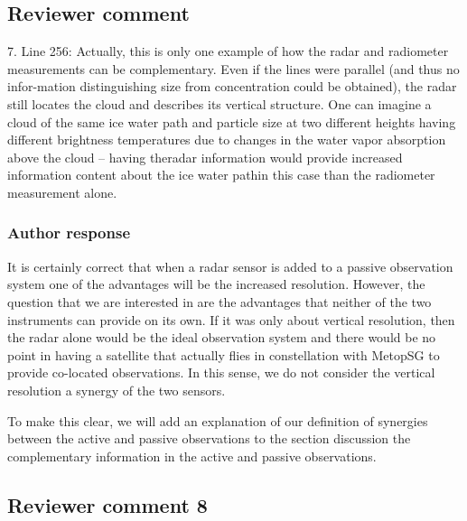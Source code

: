 \documentclass[11pt]{scrartcl}
\begin{document}
\subsection{Reviewer comment}

7.  Line 256:  Actually, this is only one example of how the radar and radiometer measurements can be complementary.  Even if the lines were parallel (and thus no infor-mation distinguishing size from concentration could be obtained), the radar still locates the cloud and describes its vertical structure.  One can imagine a cloud of the same ice water path and particle size at two different heights having different brightness temperatures due to changes in the water vapor absorption above the cloud – having theradar information would provide increased information content about the ice water pathin this case than the radiometer measurement alone.

\subsubsection*{Author response}

It is certainly correct that when a radar sensor is added to a passive observation
system one of the advantages will be the increased resolution. However, the question
that we are interested in are the advantages that neither of the two instruments can
provide on its own. If it was only about vertical resolution, then the radar
alone would be the ideal observation system and there would be no point in having
a satellite that actually flies in constellation with MetopSG to provide co-located
observations. In this sense, we do not consider the vertical resolution
a synergy of the two sensors.

To make this clear, we will add an explanation of our definition of synergies
between the active and passive observations to the section discussion the
complementary information in the active and passive observations.




\subsection*{Reviewer comment 8}
\end{document}
